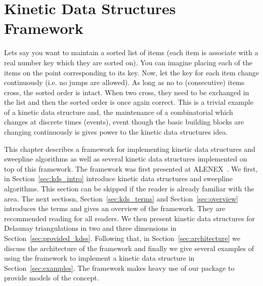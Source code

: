 
\chapter{Kinetic Data Structures Framework}
\label{chapter-kds}
\minitoc



\def\note#1{$\langle\langle${\bf #1}$\rangle\rangle$}


%

Lets say you want to maintain a sorted list of items (each item is
associate with a real number key which they are sorted on). You can
imagine placing each of the items on the point corresponding to its
key. Now, let the key for each item change continuously (i.e. no jumps
are allowed). As long as no to (consecutive) items cross, the sorted
order is intact. When two cross, they need to be exchanged in the list
and then the sorted order is once again correct. This is a trivial
example of a kinetic data structure and, the maintenance of a
combinatorial which changes at discrete times (events), event though
the basic building blocks are changing continuously is gives power to
the kinetic data structures idea.

This chapter describes a framework for implementing kinetic data
structures and sweepline algorithms as well as several kinetic data
structures implemented on top of this framework. The framework was
first presented at ALENEX~\cite{cgal:gkr-cfhm-04}. We first, in
Section~\ref{sec:kds_intro} introduce kinetic data structures and
sweepline algorithms. This section can be skipped if the reader is
already familiar with the area. The next sectiosn,
Section~\ref{sec:kds_terms} and Section~\ref{sec:overview} introduces
the terms and gives an overview of the framework. They are recommended
reading for all readers. We then present kinetic data structures for
Delaunay triangulations in two and three dimensions in
Section~\ref{sec:provided_kdss}. Following that, in
Section~\ref{sec:architecture} we discuss the architecture of the
framework and finally we give several examples of using the framework
to implement a kinetic data structure in
Section~\ref{sec:examples}. The framework makes heavy use of our
 package to provide models of the
 concept.

